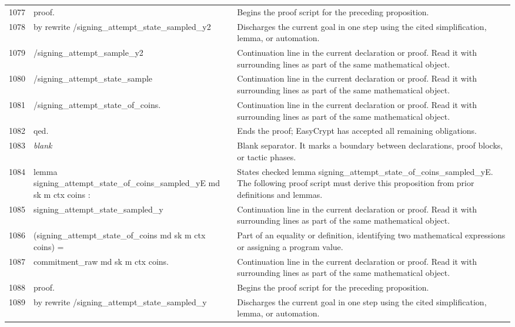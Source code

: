 \documentclass[10pt]{article}
\begin{document}
\begin{longtable}{r L{0.53\textwidth} L{0.37\textwidth}}
1077 & {\ttfamily\scriptsize proof.} & Begins the proof script for the preceding proposition. \\
1078 & {\ttfamily\scriptsize by rewrite /signing\_attempt\_state\_sampled\_y2} & Discharges the current goal in one step using the cited simplification, lemma, or automation. \\
1079 & {\ttfamily\scriptsize            /signing\_attempt\_sample\_y2} & Continuation line in the current declaration or proof.  Read it with surrounding lines as part of the same mathematical object. \\
1080 & {\ttfamily\scriptsize            /signing\_attempt\_state\_sample} & Continuation line in the current declaration or proof.  Read it with surrounding lines as part of the same mathematical object. \\
1081 & {\ttfamily\scriptsize            /signing\_attempt\_state\_of\_coins.} & Continuation line in the current declaration or proof.  Read it with surrounding lines as part of the same mathematical object. \\
1082 & {\ttfamily\scriptsize qed.} & Ends the proof; EasyCrypt has accepted all remaining obligations. \\
1083 & {\ttfamily\scriptsize \emph{blank}} & Blank separator.  It marks a boundary between declarations, proof blocks, or tactic phases. \\
1084 & {\ttfamily\scriptsize lemma signing\_attempt\_state\_of\_coins\_sampled\_yE md sk m ctx coins :} & States checked lemma signing\_attempt\_state\_of\_coins\_sampled\_yE.  The following proof script must derive this proposition from prior definitions and lemmas. \\
1085 & {\ttfamily\scriptsize   signing\_attempt\_state\_sampled\_y} & Continuation line in the current declaration or proof.  Read it with surrounding lines as part of the same mathematical object. \\
1086 & {\ttfamily\scriptsize     (signing\_attempt\_state\_of\_coins md sk m ctx coins) =} & Part of an equality or definition, identifying two mathematical expressions or assigning a program value. \\
1087 & {\ttfamily\scriptsize   commitment\_raw md sk m ctx coins.} & Continuation line in the current declaration or proof.  Read it with surrounding lines as part of the same mathematical object. \\
1088 & {\ttfamily\scriptsize proof.} & Begins the proof script for the preceding proposition. \\
1089 & {\ttfamily\scriptsize by rewrite /signing\_attempt\_state\_sampled\_y} & Discharges the current goal in one step using the cited simplification, lemma, or automation. \\

\end{longtable}
\end{document}
